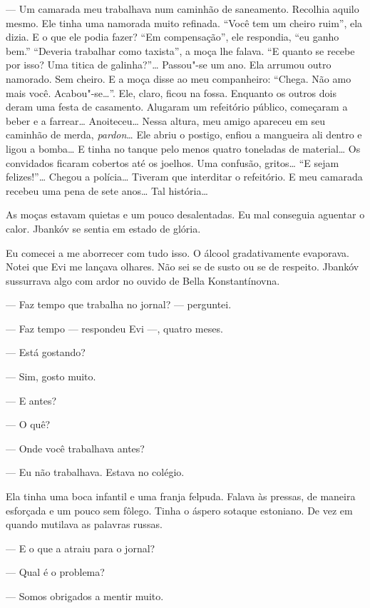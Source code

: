 --- Um camarada meu trabalhava num caminhão de saneamento.
Recolhia aquilo mesmo. Ele tinha uma namorada muito refinada. ``Você tem
um cheiro ruim'', ela dizia. E o que ele podia fazer? ``Em
compensação'', ele respondia, ``eu ganho bem.'' ``Deveria trabalhar como
taxista'', a moça lhe falava. ``E quanto se recebe por isso? Uma titica
de galinha?''\ldots{} Passou"-se um ano. Ela arrumou outro namorado. Sem
cheiro. E a moça disse ao meu companheiro: ``Chega. Não amo mais você.
Acabou"-se\ldots{}''. Ele, claro, ficou na fossa. Enquanto os outros dois
deram uma festa de casamento. Alugaram um refeitório público, começaram a beber e
a farrear\ldots{} Anoiteceu\ldots{} Nessa altura, meu amigo apareceu em seu
caminhão de merda, \emph{pardon}\ldots{} Ele abriu o postigo, enfiou a
mangueira ali dentro e ligou a bomba\ldots{} E tinha no tanque pelo menos
quatro toneladas de material\ldots{} Os convidados ficaram cobertos até os
joelhos. Uma confusão, gritos\ldots{} ``E sejam felizes!''\ldots{} Chegou a
polícia\ldots{} Tiveram que interditar o refeitório. E meu camarada recebeu
uma pena de sete anos\ldots{} Tal história\ldots{}

As moças estavam quietas e um pouco desalentadas. Eu mal conseguia
aguentar o calor. Jbankóv se sentia em estado de glória.

Eu comecei a me aborrecer com tudo isso. O álcool gradativamente
evaporava. Notei que Evi me lançava olhares. Não sei se de susto ou se
de respeito. Jbankóv sussurrava algo com ardor no ouvido de Bella
Konstantínovna.

--- Faz tempo que trabalha no jornal? --- perguntei.

--- Faz tempo --- respondeu Evi ---, quatro meses.

--- Está gostando?

--- Sim, gosto muito.

--- E antes?

--- O quê?

--- Onde você trabalhava antes?

--- Eu não trabalhava. Estava no colégio.

Ela tinha uma boca infantil e uma franja felpuda. Falava às pressas, de
maneira esforçada e um pouco sem fôlego. Tinha o áspero sotaque estoniano.
De vez em quando mutilava as palavras russas.

--- E o que a atraiu para o jornal?

--- Qual é o problema?

--- Somos obrigados a mentir muito.

